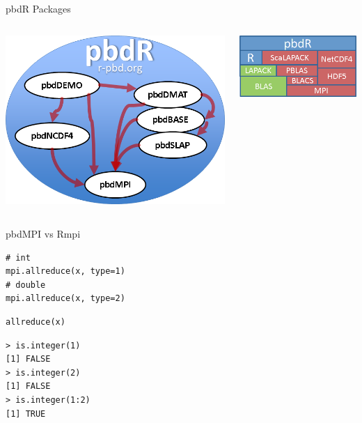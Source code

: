 \begin{frame}
  \begin{block}{pbdR Packages}
    \begin{center}
      \begin{columns}
        \begin{column}{.52\textwidth}
      \includegraphics[scale=.4]{pics/pbdR}
        \end{column}
        \hfill
        \begin{column}{.4\textwidth}
      \includegraphics[scale=.45]{pics/libs}
        \end{column}
      \end{columns}
    \end{center}
  \end{block}
\end{frame}


\begin{frame}[fragile]
\begin{block}{pbdMPI vs Rmpi}
\pause
\begin{lstlisting}[title=Reduce Operation with Rmpi]
# int
mpi.allreduce(x, type=1)
# double
mpi.allreduce(x, type=2)
\end{lstlisting}

\begin{lstlisting}[title=Reduce Operation with pbdMPI]
allreduce(x)
\end{lstlisting}

\pause
\begin{lstlisting}
> is.integer(1)
[1] FALSE
> is.integer(2)
[1] FALSE
> is.integer(1:2)
[1] TRUE
\end{lstlisting}
\end{block}
\end{frame}


